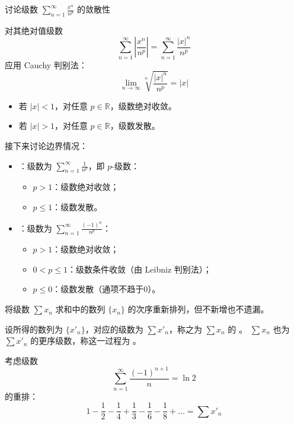 \begin{example}
	讨论级数 $\displaystyle \sum_{n=1}^{\infty} \frac{x^n}{n^p}$ 的敛散性
	
\end{example}
\begin{solution}
	对其绝对值级数
	\[
	\sum_{n=1}^{\infty} \left| \frac{x^n}{n^p} \right| = \sum_{n=1}^{\infty} \frac{|x|^n}{n^p}
	\]
	应用 Cauchy 判别法：
	\[
	\lim_{n \to \infty} \sqrt[n]{\frac{|x|^n}{n^p}} = |x|
	\]
	
	\begin{itemize}
		\item 若 $|x| < 1$，对任意 $p \in \mathbb{R}$，级数绝对收敛。
		\item 若 $|x| > 1$，对任意 $p \in \mathbb{R}$，级数发散。
	\end{itemize}
	
	接下来讨论边界情况：
	
	\begin{itemize}
		\item {}：级数为 $\displaystyle \sum_{n=1}^{\infty} \frac{1}{n^p}$，即 $p$-级数：
		\begin{itemize}
			\item $p > 1$：级数绝对收敛；
			\item $p \le 1$：级数发散。
		\end{itemize}
		
		\item {}：级数为 $\displaystyle \sum_{n=1}^{\infty} \frac{(-1)^n}{n^p}$：
		\begin{itemize}
			\item $p > 1$：级数绝对收敛；
			\item $0 < p \le 1$：级数条件收敛（由 Leibniz 判别法）；
			\item $p \le 0$：级数发散（通项不趋于0）。
		\end{itemize}
	\end{itemize}
	
\end{solution}
\begin{definition}
	将级数 $\sum x_n$ 求和中的数列 $\{x_n\}$ 的次序重新排列，但不新增也不遗漏。
	
	设所得的数列为 $\{x'_n\}$，对应的级数为 $\sum x'_n$，称之为 $\sum x_n$ 的 。
	$\sum x_n$ 也为 $\sum x'_n$ 的更序级数，称这一过程为 。
\end{definition}
\begin{example}
	考虑级数
	\[
	\sum_{n=1}^{\infty} \frac{(-1)^{n+1}}{n} = \ln 2
	\]
	的重排：
	\[
	1 - \frac{1}{2} - \frac{1}{4} + \frac{1}{3} - \frac{1}{6} - \frac{1}{8} + \dots = \sum x'_n
	\]
\end{example}

